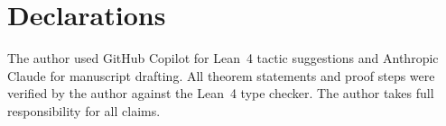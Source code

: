\documentclass[11pt,a4paper]{article}
\theoremstyle{definition}
\begin{document}
\section*{Declarations}

The author used GitHub Copilot for Lean~4 tactic suggestions and
Anthropic Claude for manuscript drafting.  All theorem statements
and proof steps were verified by the author against the Lean~4
type checker.  The author takes full responsibility for all claims.
\end{document}

